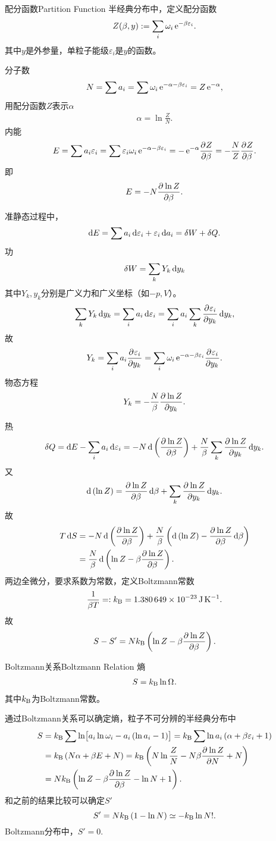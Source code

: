 \begin{definition}{配分函数}{Partition Function}
	半经典分布中，定义配分函数
	\begin{align}
		Z(\beta,y):=\sum_i\omega_i\e{-\beta\varepsilon_i}.
	\end{align}
	其中$y$是外参量，单粒子能级$\varepsilon_i$是$y$的函数。
\end{definition}
分子数
\[
	N=\sum a_i=\sum\omega_i\e{-\alpha-\beta\varepsilon_i}=Z\e{-\alpha},
\]
用配分函数$Z$表示$\alpha$
\begin{align}
	\alpha=\ln\frac ZN.
\end{align}
内能
\[
	E=\sum a_i\varepsilon_i=\sum\varepsilon_i\omega_i\e{-\alpha-\beta\varepsilon_i}=-\e{-\alpha}\pv Z\beta=-\frac NZ\pv Z\beta.
\]
即
\begin{align}
	E=-N\pv{\ln Z}\beta.
\end{align}

准静态过程中，
\[
	\d E=\sum a_i\d\varepsilon_i+\varepsilon_i\d a_i=\delta W+\delta Q.
\]
功
\[
	\delta W=\sum_kY_k\d y_k
\]
其中$Y_k,y_k$分别是广义力和广义坐标（如$-p,V$）。
\[
	\sum_kY_k\d y_k=\sum_ia_i\d\varepsilon_i=\sum_i a_i\sum_k\pv{\varepsilon_i}{y_k}\d y_k,
\]
故
\[
	Y_k=\sum_ia_i\pv{\varepsilon_i}{y_k}=\sum_i\omega_i\e{-\alpha-\beta\varepsilon_i}\pv{\varepsilon_i}{y_k}.
\]
物态方程
\begin{align}
	Y_k=-\frac N\beta\pv{\ln Z}{y_k}.
\end{align}

热
\[
	\delta Q=\d E-\sum_ia_i\d\varepsilon_i=-N\d\kh{\pv{\ln Z}\beta}+\frac N\beta\sum_k\pv{\ln Z}{y_k}\d y_k.
\]
又
\[
	\d\kh{\ln Z}=\pv{\ln Z}\beta\d\beta+\sum_k\pv{\ln Z}{y_k}\d y_k.
\]
故
\begin{align*}
	T\d S & =-N\d\kh{\pv{\ln Z}\beta}+\frac N\beta\kh{\d\kh{\ln Z}-\pv{\ln Z}\beta\d\beta} \\
	      & =\frac N\beta\d\kh{\ln Z-\beta\pv{\ln Z}\beta}.
\end{align*}
两边全微分，要求系数为常数，定义Boltzmann常数
\[
	\frac1{\beta T}=:\kB=\SI{1.380649e-23}{\J\per\K}.
\]
故
\begin{align}
	S-S'=N\kB\kh{\ln Z-\beta\pv{\ln Z}\beta}.
\end{align}
\begin{theorem}{Boltzmann关系}{Boltzmann Relation}
	熵
	\begin{align}
		S=\kB\ln\Om.
	\end{align}
	其中$\kB$为Boltzmann常数。
\end{theorem}
通过Boltzmann关系可以确定熵，粒子不可分辨的半经典分布中
\begin{align}\notag
	S & =\kB\sum\ln\bigfkh{a_i\ln\omega_i-a_i\kh{\ln a_i-1}}=\kB\sum\ln a_i\kh{\alpha+\beta\varepsilon_i+1} \\\notag
	  & =\kB\kh{N\alpha+\beta E+N}=\kB\kh{N\ln\frac ZN-N\beta\pv{\ln Z}N+N}                              \\
	  & =N\kB\kh{\ln Z-\beta\pv{\ln Z}\beta-\ln N+1}.
\end{align}
和之前的结果比较可以确定$S'$
\[
	S'=N\kB\kh{1-\ln N}\simeq-\kB\ln N!.
\]
Boltzmann分布中，$S'=0.$


